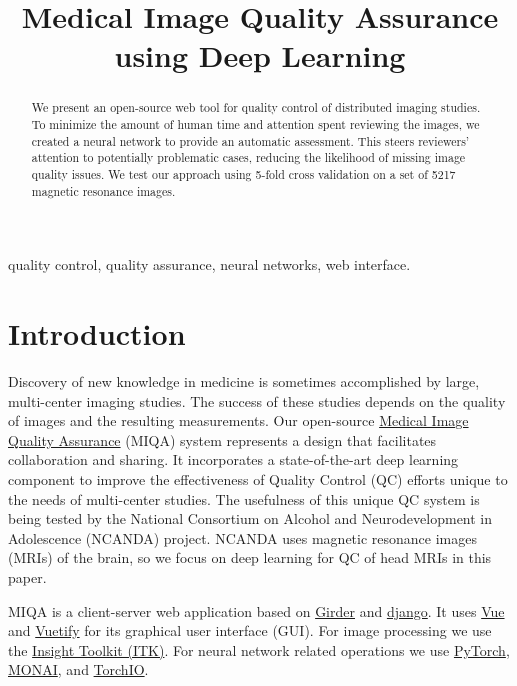 \documentclass{midl} %
\title[Medical Image Quality Assurance using Deep Learning]{Medical Image Quality Assurance using Deep Learning}
\begin{document}
\maketitle

\begin{abstract}
We present an open-source web tool for quality control of distributed imaging studies.
To minimize the amount of human time and attention spent reviewing the images,
we created a neural network to provide an automatic assessment.
This steers reviewers' attention to potentially problematic cases,
reducing the likelihood of missing image quality issues.
We test our approach using 5-fold cross validation on a set of 5217 magnetic resonance images.
\end{abstract}

\begin{keywords}
quality control, quality assurance, neural networks, web interface.
\end{keywords}

\section{Introduction}

Discovery of new knowledge in medicine is sometimes accomplished by large, multi-center imaging studies. The success of these studies depends on the quality of images and the resulting measurements. 
Our open-source \href{https://github.com/OpenImaging/miqa}{Medical Image Quality Assurance} (MIQA) system represents a design that facilitates collaboration and sharing. It incorporates a state-of-the-art deep learning component to improve the effectiveness of Quality Control (QC) efforts unique to the needs of multi-center studies. The usefulness of this unique QC system is being tested by the National Consortium on Alcohol and Neurodevelopment in Adolescence (NCANDA) project. NCANDA uses magnetic resonance images (MRIs) of the brain, so we focus on deep learning for QC of head MRIs in this paper.

MIQA is a client-server web application based on \href{https://github.com/girder/girder}{Girder} and \href{https://www.django-rest-framework.org/}{django}. It uses \href{https://vuejs.org/}{Vue} and \href{https://vuetifyjs.com/}{Vuetify} for its graphical user interface (GUI). For image processing we use the \href{https://itk.org/}{Insight Toolkit (ITK)}. For neural network related operations we use \href{https://pytorch.org/}{PyTorch}, \href{https://monai.io/}{MONAI}, and \href{https://torchio.readthedocs.io/}{TorchIO}.
\end{document}
